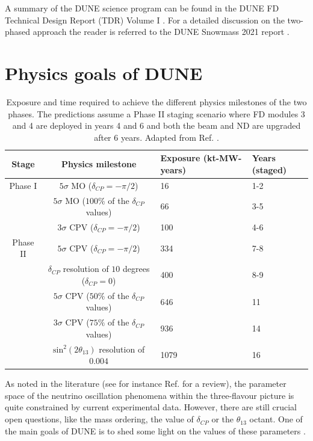 A summary of the DUNE science program can be found in the DUNE FD Technical Design Report (TDR) Volume I \cite{DUNE2020TDR1}. For a detailed discussion on the two-phased approach the reader is referred to the DUNE Snowmass 2021 report \cite{DUNE2022Snowmass}.

\section{Physics goals of DUNE}

\begin{table}[]
	\caption[Exposure and time required to achieve the different physics milestones of the two phases]{Exposure and time required to achieve the different physics milestones of the two phases. The predictions assume a Phase II staging scenario where FD modules 3 and 4 are deployed in years 4 and 6 and both the beam and ND are upgraded after 6 years. Adapted from Ref. \cite{DUNE2022Snowmass}.}
	\centering
	\begin{tabular}{c|c|C{3.0cm}|C{2.0cm}}
	Stage    & Physics milestone                                          & Exposure (kt-MW-years) & Years (staged) \\ \hline
	Phase I  & $5\sigma$ MO ($\delta_{CP} = -\pi/2$)                      & 16                     & 1-2            \\
			 & $5\sigma$ MO ($100\%$ of the $\delta_{CP}$ values)         & 66                     & 3-5            \\
			 & $3\sigma$ CPV ($\delta_{CP} = -\pi/2$)                     & 100                    & 4-6            \\ \hline
	Phase II & $5\sigma$ CPV ($\delta_{CP} = -\pi/2$)                     & 334                    & 7-8            \\
			 & $\delta_{CP}$ resolution of $10$ degrees ($\delta_{CP}=0$) & 400                    & 8-9            \\
			 & $5\sigma$ CPV ($50\%$ of the $\delta_{CP}$ values)         & 646                    & 11             \\
			 & $3\sigma$ CPV ($75\%$ of the $\delta_{CP}$ values)         & 936                    & 14             \\
			 & $\mathrm{sin}^{2}(2\theta_{13})$ resolution of $0.004$       & 1079                   & 16            
	\end{tabular}
	\label{tab:dune_phases_physics}
\end{table}

As noted in the literature (see for instance Ref. \cite{deSalas2020} for a review), the parameter space of the neutrino oscillation phenomena within the three-flavour picture is quite constrained by current experimental data. However, there are still crucial open questions, like the mass ordering, the value of $\delta_{CP}$ or the $\theta_{13}$ octant. One of the main goals of DUNE is to shed some light on the values of these parameters \cite{DUNE2020TDR2}.

